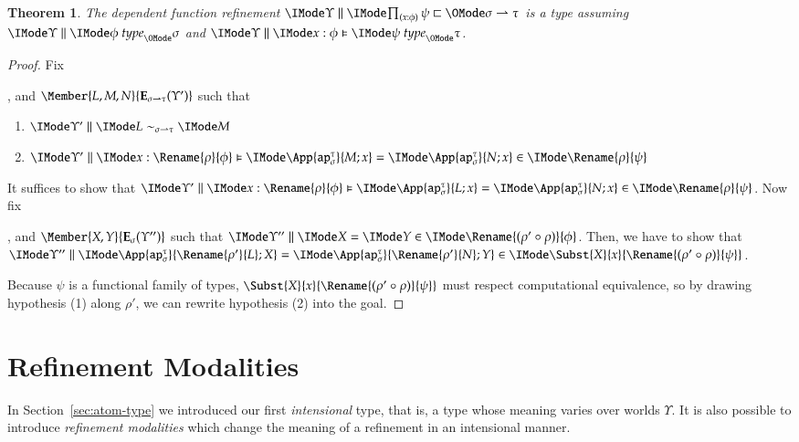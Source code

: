 \documentclass[11pt]{article}
\newtheorem{thm}{Theorem}[section]
\theoremstyle{definition}
\theoremstyle{notation}
\theoremstyle{remark}
\numberwithin{equation}{section}
\newcommand\Exprs{\mathbf{E}}
\begin{document}
\begin{thm}
  The dependent function refinement
  $\Refines{\Upsilon}{\prod_{(x:\phi)}\psi}{\SortArr{\sigma}{\tau}}$ is a
  type assuming $\IsType{\Upsilon}{\phi}{\sigma}$ and
  $\IsTypeFam{\Upsilon}{x:\phi}{\psi}{\tau}$.
\end{thm}
\begin{proof}
  Fix
  , and $\Member{L,M,N}{\Exprs_{\SortArr{\sigma}{\tau}}(\Upsilon')}$ such that
  \begin{enumerate}
    \item $\PBinRel{\sim_{\SortArr{\sigma}{\tau}}}{\Upsilon'}{L}{M}$
    \item $\FRMemEq{\Upsilon'}{x:\Rename{\rho}{\phi}}{\App{\OpAp{\sigma}{\tau}}{M;x}}{\App{\OpAp{\sigma}{\tau}}{N;x}}{\Rename{\rho}{\psi}}$
  \end{enumerate}
%
  It suffices to show that
  $\FRMemEq{\Upsilon'}{x:\Rename{\rho}{\phi}}{\App{\OpAp{\sigma}{\tau}}{L;x}}{\App{\OpAp{\sigma}{\tau}}{N;x}}{\Rename{\rho}{\psi}}$.
%
  Now fix
  , and $\Member{X,Y}{\Exprs_\sigma(\Upsilon'')}$ such that
  $\RMemEq{\Upsilon''}{X}{Y}{\Rename{(\rho'\circ\rho)}{\phi}}$.
  Then, we have to show that
  $\RMemEq{\Upsilon''}{%
    \App{\OpAp{\sigma}{\tau}}{
      \Rename{\rho'}{L};
      X
    }
  }{
    \App{\OpAp{\sigma}{\tau}}{
      \Rename{\rho'}{N};
      Y
    }
  }{\Subst{X}{x}{\Rename{(\rho'\circ\rho)}{\psi}}}$.

  Because $\psi$ is a functional family of types,
  $\Subst{X}{x}{\Rename{(\rho'\circ\rho)}{\psi}}$ must respect
  computational equivalence, so by drawing hypothesis (1) along $\rho'$, we
  can rewrite hypothesis (2) into the goal.
\end{proof}

\section{Refinement Modalities}

In Section~\ref{sec:atom-type} we introduced our first \emph{intensional} type,
that is, a type whose meaning varies over worlds $\Upsilon$. It is also
possible to introduce \emph{refinement modalities} which change the
meaning of a refinement in an intensional manner.
\end{document}
